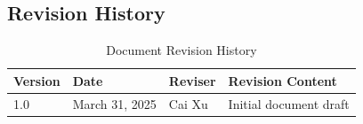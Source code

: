 \documentclass[a4paper,12pt]{article}
\begin{document}
\subsection{Revision History}

\begin{table}[htbp]
\centering
\begin{tabular}{llll}
\toprule
\textbf{Version} & \textbf{Date} & \textbf{Reviser} & \textbf{Revision Content} \\
\midrule
1.0 & March 31, 2025 & Cai Xu & Initial document draft \\
\bottomrule
\end{tabular}
\caption{Document Revision History}
\end{table}
\end{document}
